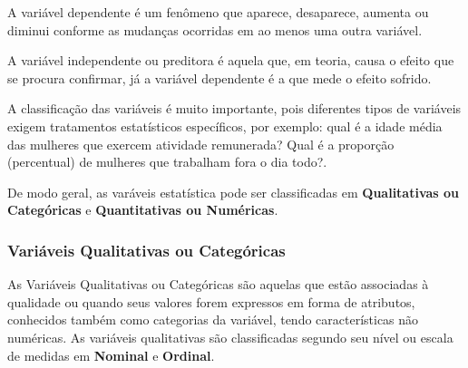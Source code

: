 A variável dependente é um fenômeno que aparece, desaparece, aumenta ou diminui conforme as mudanças ocorridas em ao menos uma outra variável.\vskip0.3cm 

A variável independente ou preditora é aquela que, em teoria, causa o efeito que se procura confirmar, já a variável dependente é a que mede o efeito sofrido.\vskip0.3cm

A classificação das variáveis é muito importante, pois diferentes tipos de variáveis exigem tratamentos estatísticos específicos, por exemplo: qual é a idade média das mulheres que exercem atividade remunerada? Qual é a proporção (percentual) de mulheres que trabalham fora o dia todo?.\vskip0.3cm

De modo geral, as varáveis estatística pode ser classificadas em \textbf{Qualitativas ou Categóricas} e \textbf{Quantitativas ou Numéricas}.\vskip0.3cm


\subsubsection{Variáveis Qualitativas ou Categóricas}

As Variáveis Qualitativas ou Categóricas são aquelas que estão associadas à qualidade ou quando seus valores forem expressos em forma de atributos, conhecidos também como categorias da variável, tendo características não numéricas. As variáveis qualitativas são classificadas segundo seu nível ou escala de medidas em \textbf{Nominal} e \textbf{Ordinal}.\vskip0.3cm

